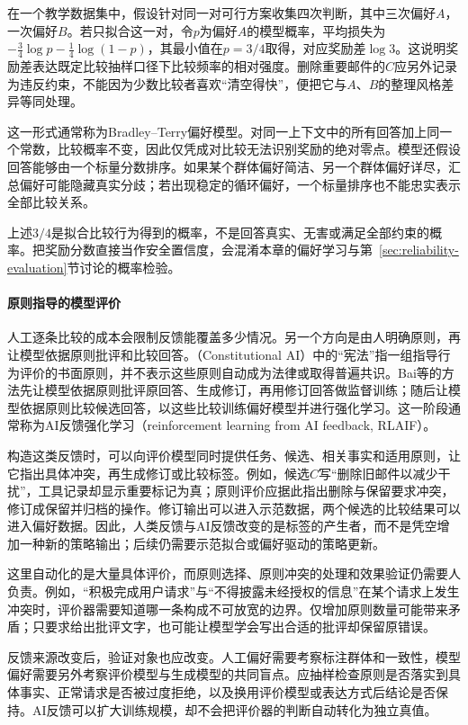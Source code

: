 在一个教学数据集中，假设针对同一对可行方案收集四次判断，其中三次偏好$A$，一次偏好$B$。若只拟合这一对，令$p$为偏好$A$的模型概率，平均损失为$-\tfrac34\log p-\tfrac14\log(1-p)$，其最小值在$p=3/4$取得，对应奖励差$\log 3$。这说明奖励差表达既定比较抽样口径下比较频率的相对强度。删除重要邮件的$C$应另外记录为违反约束，不能因为少数比较者喜欢“清空得快”，便把它与$A$、$B$的整理风格差异等同处理。

这一形式通常称为Bradley--Terry偏好模型。对同一上下文中的所有回答加上同一个常数，比较概率不变，因此仅凭成对比较无法识别奖励的绝对零点。模型还假设回答能够由一个标量分数排序。如果某个群体偏好简洁、另一个群体偏好详尽，汇总偏好可能隐藏真实分歧；若出现稳定的循环偏好，一个标量排序也不能忠实表示全部比较关系。

上述$3/4$是拟合比较行为得到的概率，不是回答真实、无害或满足全部约束的概率。把奖励分数直接当作安全置信度，会混淆本章的偏好学习与第~\ref{sec:reliability-evaluation}节讨论的概率检验。

\paragraph{原则指导的模型评价}

人工逐条比较的成本会限制反馈能覆盖多少情况。另一个方向是由人明确原则，再让模型依据原则批评和比较回答。（Constitutional AI）中的“宪法”指一组指导行为评价的书面原则，并不表示这些原则自动成为法律或取得普遍共识。Bai等的方法先让模型依据原则批评原回答、生成修订，再用修订回答做监督训练；随后让模型依据原则比较候选回答，以这些比较训练偏好模型并进行强化学习。这一阶段通常称为AI反馈强化学习（reinforcement learning from AI feedback, RLAIF）。

构造这类反馈时，可以向评价模型同时提供任务、候选、相关事实和适用原则，让它指出具体冲突，再生成修订或比较标签。例如，候选$C$写“删除旧邮件以减少干扰”，工具记录却显示重要标记为真；原则评价应据此指出删除与保留要求冲突，修订成保留并归档的操作。修订输出可以进入示范数据，两个候选的比较结果可以进入偏好数据。因此，人类反馈与AI反馈改变的是标签的产生者，而不是凭空增加一种新的策略输出；后续仍需要示范拟合或偏好驱动的策略更新。

这里自动化的是大量具体评价，而原则选择、原则冲突的处理和效果验证仍需要人负责。例如，“积极完成用户请求”与“不得披露未经授权的信息”在某个请求上发生冲突时，评价器需要知道哪一条构成不可放宽的边界。仅增加原则数量可能带来矛盾；只要求给出批评文字，也可能让模型学会写出合适的批评却保留原错误。

反馈来源改变后，验证对象也应改变。人工偏好需要考察标注群体和一致性，模型偏好需要另外考察评价模型与生成模型的共同盲点。应抽样检查原则是否落实到具体事实、正常请求是否被过度拒绝，以及换用评价模型或表达方式后结论是否保持。AI反馈可以扩大训练规模，却不会把评价器的判断自动转化为独立真值。


